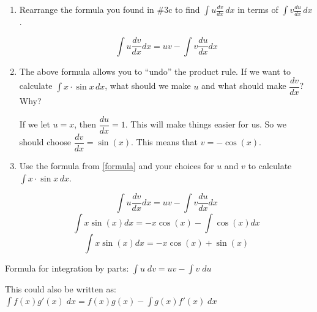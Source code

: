 \documentclass[main]{subfiles}
\begin{document}
\begin{enumerate}
\begin{enumerate}
\item\label{formula}\begin{problem}[\vfill] Rearrange the formula you found in \#3c to find $\displaystyle \int u \frac{dv}{dx}  \, dx$ in terms of  $\displaystyle \int v  \frac{du}{dx}  \, dx$. \end{problem} 

\begin{solution} 
  $$ \displaystyle \int u\frac{dv}{dx}dx =uv  - \displaystyle\int v \frac{du}{dx} dx$$
  \end{solution} 

\item \begin{problem}[\vfill] The above formula allows you to ``undo'' the product rule. If we want to calculate  $\displaystyle \int x \cdot \sin x  \, dx$, what should we make $u$ and what should make $\dfrac{dv}{dx}$? Why? 
\end{problem} 

\begin{solution} 
If we let $u=x$, then $\dfrac{du}{dx} = 1$. This will make things easier for us. So we should choose $\dfrac{dv}{dx} = \sin(x)$. This means that $v = - \cos(x)$.
\end{solution}  
\item \begin{problem}[\vfill]Use the formula from \ref{formula} and your choices for $u$ and $v$ to calculate $\displaystyle \int x \cdot \sin x   \, dx$.\end{problem} 

\begin{solution} 
  $$ \displaystyle \int u\frac{dv}{dx}dx =uv  - \displaystyle\int v \frac{du}{dx} dx$$
  $$ \displaystyle \int x \sin(x) dx =-x \cos(x)  - \displaystyle\int \cos(x) dx$$
    $$ \displaystyle \int x \sin(x) dx =-x \cos(x)  + \sin(x)$$

\end{solution} 


\end{enumerate} 

\pspace{\newpage}

\begin{framed}
    Formula for integration by parts: $\displaystyle \int u \;dv = uv - \displaystyle \int v \;du$

    This could also be written as: $\displaystyle \int f(x) g'(x) \;dx = f(x)g(x) - \displaystyle\int g(x)f'(x) \;dx$

\end{framed}



\end{enumerate}
\end{document}
